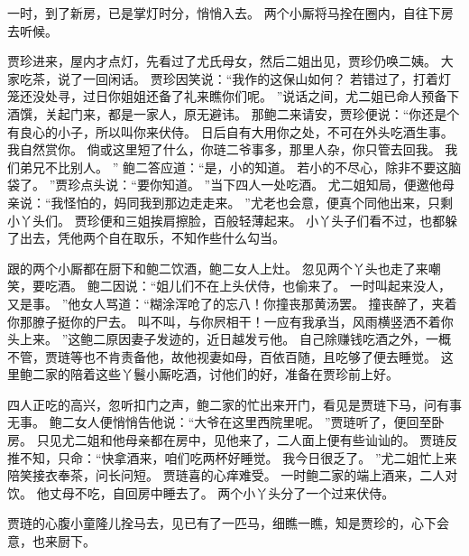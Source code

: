 一时，到了新房，已是掌灯时分，悄悄入去。
两个小厮将马拴在圈内，自往下房去听候。
\par
贾珍进来，屋内才点灯，先看过了尤氏母女，然后二姐出见，贾珍仍唤二姨。
大家吃茶，说了一回闲话。
贾珍因笑说：“我作的这保山如何？
若错过了，打着灯笼还没处寻，过日你姐姐还备了礼来瞧你们呢。
”说话之间，尤二姐已命人预备下酒馔，关起门来，都是一家人，原无避讳。
那鲍二来请安，贾珍便说：“你还是个有良心的小子，所以叫你来伏侍。
日后自有大用你之处，不可在外头吃酒生事。
我自然赏你。
倘或这里短了什么，你琏二爷事多，那里人杂，你只管去回我。
我们弟兄不比别人。
”
鲍二答应道：“是，小的知道。
若小的不尽心，除非不要这脑袋了。
”贾珍点头说：“要你知道。
”当下四人一处吃酒。
尤二姐知局，便邀他母亲说：“我怪怕的，妈同我到那边走走来。
”尤老也会意，便真个同他出来，只剩小丫头们。
贾珍便和三姐挨肩擦脸，百般轻薄起来。
小丫头子们看不过，也都躲了出去，凭他两个自在取乐，不知作些什么勾当。
\par
跟的两个小厮都在厨下和鲍二饮酒，鲍二女人上灶。
忽见两个丫头也走了来嘲笑，要吃酒。
鲍二因说：“姐儿们不在上头伏侍，也偷来了。
一时叫起来没人，又是事。
”他女人骂道：“糊涂浑呛了的忘八！你撞丧那黄汤罢。
撞丧醉了，夹着你那膫子挺你的尸去。
叫不叫，与你屄相干！一应有我承当，风雨横竖洒不着你头上来。
”这鲍二原因妻子发迹的，近日越发亏他。
自己除赚钱吃酒之外，一概不管，贾琏等也不肯责备他，故他视妻如母，百依百随，且吃够了便去睡觉。
这里鲍二家的陪着这些丫鬟小厮吃酒，讨他们的好，准备在贾珍前上好。
\par
四人正吃的高兴，忽听扣门之声，鲍二家的忙出来开门，看见是贾琏下马，问有事无事。
鲍二女人便悄悄告他说：“大爷在这里西院里呢。
”贾琏听了，便回至卧房。
只见尤二姐和他母亲都在房中，见他来了，二人面上便有些讪讪的。
贾琏反推不知，只命：“快拿酒来，咱们吃两杯好睡觉。
我今日很乏了。
”尤二姐忙上来陪笑接衣奉茶，问长问短。
贾琏喜的心痒难受。
一时鲍二家的端上酒来，二人对饮。
他丈母不吃，自回房中睡去了。
两个小丫头分了一个过来伏侍。
\par
贾琏的心腹小童隆儿拴马去，见已有了一匹马，细瞧一瞧，知是贾珍的，心下会意，也来厨下。

